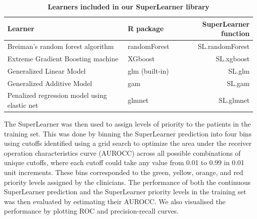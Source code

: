 \documentclass[10pt,letterpaper]{article}\usepackage[]{graphicx}\usepackage[]{color}
\begin{document}
\begin{table}[h!]
  \begin{adjustwidth}{-0.25in}{0in}
  \caption{\bf Learners included in our SuperLearner library}
  \label{tab:superlearner-library}
  \begin{tabular}{llr}
    \hline
    Learner                                       & R package                        & SuperLearner function \\
    \hline
    Breiman's random forest algorithm             & randomForest \cite{randomforest} & SL.randomForest \\
    Extreme Gradient Boosting machine             & XGboost \cite{xgboost}           & SL.xgboost \\
    Generalized Linear Model                      & glm (built-in)                   & SL.glm \\
    Generalized Additive Model                    & gam       \cite{gam}             & SL.gam \\
    Penalized regression model using elastic net  & glmnet \cite{glmnet}             & SL.glmnet \\
    \hline
  \end{tabular}
  \end{adjustwidth}
\end{table}

The SuperLearner was then used to assign levels of priority to the patients in
the training set. This was done by binning the SuperLearner prediction into four
bins using cutoffs identified using a grid search to optimize the area under the
receiver operation characteristics curve (AUROCC) across all possible
combinations of unique cutoffs, where each cutoff could take any value from 0.01
to 0.99 in 0.01 unit increments. These bins corresponded to the green, yellow,
orange, and red priority levels assigned by the clinicians. The performance of
both the continuous SuperLearner prediction and the SuperLearner priority levels
in the training set was then evaluated by estimating their AUROCC. We also
visualised the performance by plotting ROC and precision-recall curves.
\end{document}
